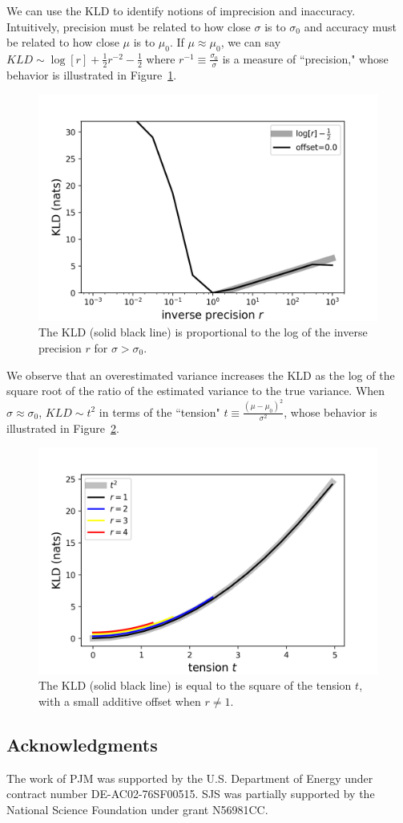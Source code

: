 \documentclass[\docopts]{\docclass}
\begin{document}
We can use the KLD to identify notions of imprecision and inaccuracy.
Intuitively, precision must be related to how close $\sigma$ is to $\sigma_{0}$
and accuracy must be related to how close $\mu$ is to $\mu_{0}$.  If
$\mu\approx\mu_{0}$, we can say $KLD\sim\log[r] + \frac{1}{2}r^{-2} -
\frac{1}{2}$ where
$r^{-1}\equiv\frac{\sigma_{0}}{\sigma}$ is a measure of ``precision," whose behavior is illustrated in Figure~\ref{fig:precision}.
\begin{figure}
  \includegraphics[width=0.9\columnwidth]{figures/kld_precision.png}
  \caption{The KLD (solid black line) is proportional to the log of the inverse
precision $r$ for $\sigma>\sigma_{0}$.
  \label{fig:precision}}
\end{figure}
We observe that an overestimated variance increases the KLD as the log of the
square root of the ratio of the estimated variance to the true variance.  When
$\sigma\approx\sigma_{0}$, $KLD\sim t^{2}$ in terms of the ``tension"
$t\equiv\frac{(\mu-\mu_{0})^{2}}{\sigma^{2}}$, whose behavior is illustrated in
Figure~\ref{fig:tension}.
\begin{figure}
  \includegraphics[width=0.9\columnwidth]{figures/kld_tension.png}
  \caption{The KLD (solid black line) is equal to the square of the tension
$t$, with a small additive offset when $r\neq1$.
  \label{fig:tension}}
\end{figure}




\subsection*{Acknowledgments}

The work of PJM was supported by the U.S. Department of Energy under
contract number DE-AC02-76SF00515.
SJS was partially supported by the National Science Foundation under grant
N56981CC.








\end{document}

